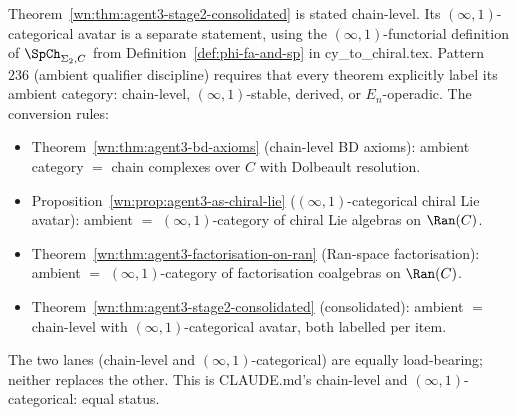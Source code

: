 \begin{remark}
\label{wn:rem:agent3-ambient-qualifier-separation}
Theorem~\ref{wn:thm:agent3-stage2-consolidated} is stated chain-level. Its $(\infty,1)$-categorical avatar is a separate statement, using the $(\infty,1)$-functorial definition of $\SpCh_{\Sigma_2,C}$ from Definition~\ref{def:phi-fa-and-sp} in cy\_to\_chiral.tex. Pattern~$236$ (ambient qualifier discipline) requires that every theorem explicitly label its ambient category: chain-level, $(\infty,1)$-stable, derived, or $E_n$-operadic. The conversion rules:
\begin{itemize}
 \item Theorem~\ref{wn:thm:agent3-bd-axioms} (chain-level BD axioms): ambient category $=$ chain complexes over $C$ with Dolbeault resolution.
 \item Proposition~\ref{wn:prop:agent3-as-chiral-lie} ($(\infty,1)$-categorical chiral Lie avatar): ambient $=$ $(\infty,1)$-category of chiral Lie algebras on $\Ran(C)$.
 \item Theorem~\ref{wn:thm:agent3-factorisation-on-ran} (Ran-space factorisation): ambient $=$ $(\infty,1)$-category of factorisation coalgebras on $\Ran(C)$.
 \item Theorem~\ref{wn:thm:agent3-stage2-consolidated} (consolidated): ambient $=$ chain-level with $(\infty,1)$-categorical avatar, both labelled per item.
\end{itemize}
The two lanes (chain-level and $(\infty,1)$-categorical) are equally load-bearing; neither replaces the other. This is CLAUDE.md's chain-level and $(\infty,1)$-categorical: equal status.
\end{remark}

